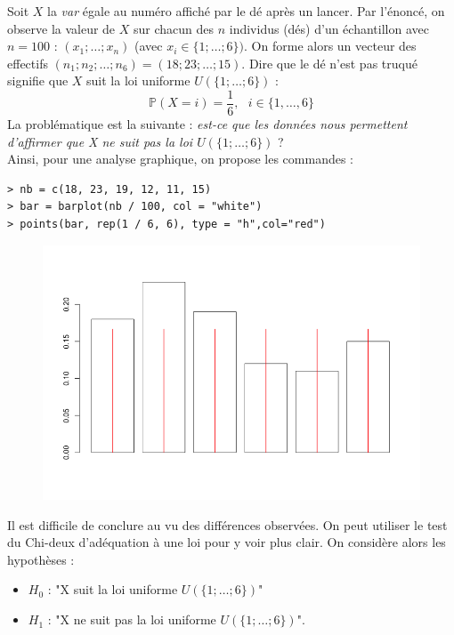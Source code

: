 Soit $X$ la \textit{var} égale au numéro affiché par le dé après un lancer. Par l'énoncé, on observe la valeur de $X$ sur chacun des $n$ individus (dés) d'un échantillon avec $n = 100$ : $(x_{1}; \dots ; x_{n})$ (avec $x_{i} \in \{1; \dots ; 6\})$. On forme alors un vecteur des effectifs $(n_{1}; n_{2}; \dots ; n_{6}) = (18; 23; \dots ; 15)$.\newline
Dire que le dé n'est pas truqué signifie que $X$ suit la loi uniforme $\mathit{U}(\{1; \dots ; 6\})$ :
$$\mathbb{P}(X=i) = \frac{1}{6}, \textrm{ } i \in \{1,\dots, 6\}$$
La problématique est la suivante : \textit{est-ce que les données nous permettent d'affirmer que X ne suit pas la loi $\mathit{U}(\{1; \dots ; 6\})$} ?\newline
\\
Ainsi, pour une analyse graphique, on propose les commandes :
\begin{lstlisting}[language=html]
> nb = c(18, 23, 19, 12, 11, 15)
> bar = barplot(nb / 100, col = "white")
> points(bar, rep(1 / 6, 6), type = "h",col="red")
\end{lstlisting}
\begin{figure}[H]\begin{center}\includegraphics[scale=1]{ilu/adeq14.png}\end{center}\end{figure}
Il est difficile de conclure au vu des différences observées.\newline
On peut utiliser le test du Chi-deux d'adéquation à une loi pour y voir plus clair. On considère alors les hypothèses :
\begin{itemize}
  \item $H_{0}$ : "X suit la loi uniforme $\mathit{U}(\{1; \dots ; 6\})$"
  \item $H_{1}$ : "X ne suit pas la loi uniforme $\mathit{U}(\{1; \dots ; 6\})$".
\end{itemize}
